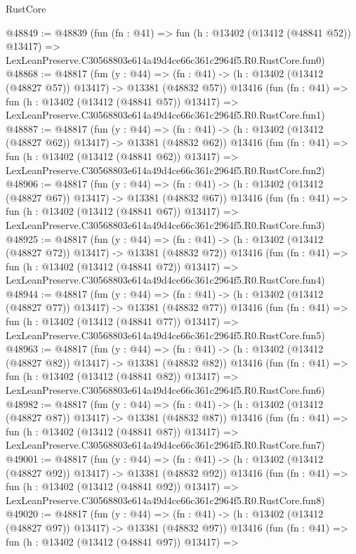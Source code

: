 \begin{lexlean}{RustCore}
\begin{coremodule}
@48849 := @48839
    (fun (fn : @41) =>
    fun (h : @13402 (@13412 (@48841 @52)) @13417) =>
    LexLeanPreserve.C30568803e614a49d4ce66c361c2964f5.R0.RustCore.fun0)
@48868 := @48817
    (fun (y : @44) =>
    (fn : @41) -> (h : @13402 (@13412 (@48827 @57)) @13417) -> @13381 (@48832 @57))
    @13416
    (fun (fn : @41) =>
    fun (h : @13402 (@13412 (@48841 @57)) @13417) =>
    LexLeanPreserve.C30568803e614a49d4ce66c361c2964f5.R0.RustCore.fun1)
@48887 := @48817
    (fun (y : @44) =>
    (fn : @41) -> (h : @13402 (@13412 (@48827 @62)) @13417) -> @13381 (@48832 @62))
    @13416
    (fun (fn : @41) =>
    fun (h : @13402 (@13412 (@48841 @62)) @13417) =>
    LexLeanPreserve.C30568803e614a49d4ce66c361c2964f5.R0.RustCore.fun2)
@48906 := @48817
    (fun (y : @44) =>
    (fn : @41) -> (h : @13402 (@13412 (@48827 @67)) @13417) -> @13381 (@48832 @67))
    @13416
    (fun (fn : @41) =>
    fun (h : @13402 (@13412 (@48841 @67)) @13417) =>
    LexLeanPreserve.C30568803e614a49d4ce66c361c2964f5.R0.RustCore.fun3)
@48925 := @48817
    (fun (y : @44) =>
    (fn : @41) -> (h : @13402 (@13412 (@48827 @72)) @13417) -> @13381 (@48832 @72))
    @13416
    (fun (fn : @41) =>
    fun (h : @13402 (@13412 (@48841 @72)) @13417) =>
    LexLeanPreserve.C30568803e614a49d4ce66c361c2964f5.R0.RustCore.fun4)
@48944 := @48817
    (fun (y : @44) =>
    (fn : @41) -> (h : @13402 (@13412 (@48827 @77)) @13417) -> @13381 (@48832 @77))
    @13416
    (fun (fn : @41) =>
    fun (h : @13402 (@13412 (@48841 @77)) @13417) =>
    LexLeanPreserve.C30568803e614a49d4ce66c361c2964f5.R0.RustCore.fun5)
@48963 := @48817
    (fun (y : @44) =>
    (fn : @41) -> (h : @13402 (@13412 (@48827 @82)) @13417) -> @13381 (@48832 @82))
    @13416
    (fun (fn : @41) =>
    fun (h : @13402 (@13412 (@48841 @82)) @13417) =>
    LexLeanPreserve.C30568803e614a49d4ce66c361c2964f5.R0.RustCore.fun6)
@48982 := @48817
    (fun (y : @44) =>
    (fn : @41) -> (h : @13402 (@13412 (@48827 @87)) @13417) -> @13381 (@48832 @87))
    @13416
    (fun (fn : @41) =>
    fun (h : @13402 (@13412 (@48841 @87)) @13417) =>
    LexLeanPreserve.C30568803e614a49d4ce66c361c2964f5.R0.RustCore.fun7)
@49001 := @48817
    (fun (y : @44) =>
    (fn : @41) -> (h : @13402 (@13412 (@48827 @92)) @13417) -> @13381 (@48832 @92))
    @13416
    (fun (fn : @41) =>
    fun (h : @13402 (@13412 (@48841 @92)) @13417) =>
    LexLeanPreserve.C30568803e614a49d4ce66c361c2964f5.R0.RustCore.fun8)
@49020 := @48817
    (fun (y : @44) =>
    (fn : @41) -> (h : @13402 (@13412 (@48827 @97)) @13417) -> @13381 (@48832 @97))
    @13416
    (fun (fn : @41) =>
    fun (h : @13402 (@13412 (@48841 @97)) @13417) =>

\end{coremodule}
\end{lexlean}
